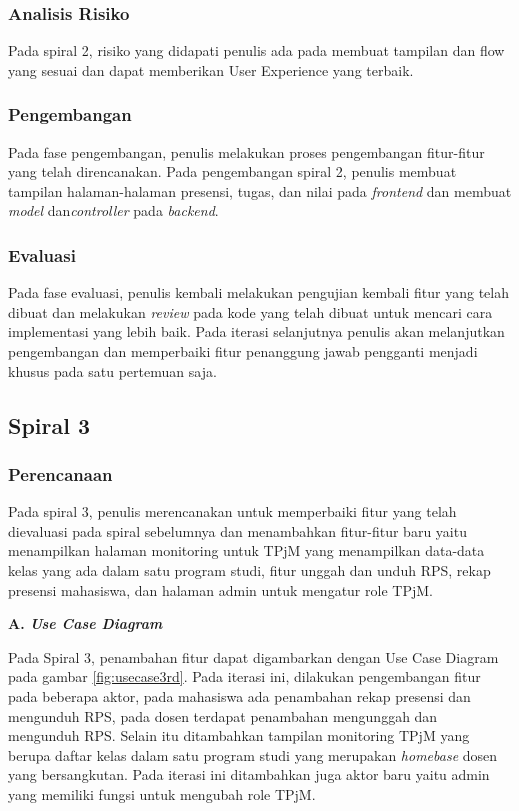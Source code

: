 \subsubsection{Analisis Risiko}
	Pada spiral 2, risiko yang didapati penulis ada pada membuat tampilan dan flow yang sesuai dan dapat memberikan User Experience yang terbaik.
\subsubsection{Pengembangan}
	Pada fase pengembangan, penulis melakukan proses pengembangan fitur-fitur yang telah direncanakan. Pada pengembangan spiral 2, penulis membuat tampilan halaman-halaman presensi, tugas, dan nilai pada \textit{frontend} dan membuat \textit{model} dan\textit{controller} pada \textit{backend}.
\subsubsection{Evaluasi}
	Pada fase evaluasi, penulis kembali melakukan pengujian kembali fitur yang telah dibuat dan melakukan \textit{review} pada kode yang telah dibuat untuk mencari cara implementasi yang lebih baik. Pada iterasi selanjutnya penulis akan melanjutkan pengembangan dan memperbaiki fitur penanggung jawab pengganti menjadi khusus pada satu pertemuan saja.

\subsection{Spiral 3}		%
\subsubsection{Perencanaan}
	Pada spiral 3, penulis merencanakan untuk memperbaiki fitur yang telah dievaluasi pada spiral sebelumnya dan menambahkan fitur-fitur baru yaitu menampilkan halaman monitoring untuk TPjM yang menampilkan data-data kelas yang ada dalam satu program studi, fitur unggah dan unduh RPS, rekap presensi mahasiswa, dan halaman admin untuk mengatur role TPjM.

\textbf{A. \textit{Use Case Diagram}}

	Pada Spiral 3, penambahan fitur dapat digambarkan dengan Use Case Diagram pada gambar \ref{fig:usecase3rd}. Pada iterasi ini, dilakukan pengembangan fitur pada beberapa aktor, pada mahasiswa ada penambahan rekap presensi dan mengunduh RPS, pada dosen terdapat penambahan mengunggah dan mengunduh RPS. Selain itu ditambahkan tampilan monitoring TPjM yang berupa daftar kelas dalam satu program studi yang merupakan \textit{homebase} dosen yang bersangkutan. Pada iterasi ini ditambahkan juga aktor baru yaitu admin yang memiliki fungsi untuk mengubah role TPjM.

